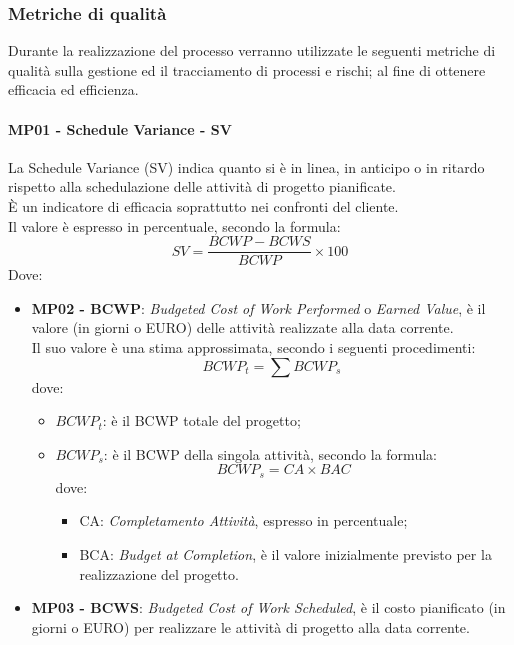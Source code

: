 	 \subsubsection{Metriche di qualità}
	 Durante la realizzazione del processo verranno utilizzate le seguenti metriche di qualità sulla gestione ed il tracciamento di processi e rischi; al fine di ottenere efficacia ed efficienza.
	 \paragraph{MP01 - Schedule Variance - SV}
	 La Schedule Variance (SV) indica quanto si è in linea, in anticipo o in ritardo rispetto alla schedulazione delle attività di progetto pianificate. \\
	 È un indicatore di efficacia soprattutto nei confronti del cliente.\\
	 Il valore è espresso in percentuale, secondo la formula:
	\begin{displaymath}
		SV = \frac{BCWP-BCWS}{BCWP}\times100
	\end{displaymath}
	Dove:

		\begin{itemize}
			\item {\bfseries MP02 - BCWP}: {\itshape Budgeted Cost of Work Performed} o {\itshape
			Earned Value}, è  il valore (in giorni o EURO) delle attività realizzate alla data corrente.\\
			Il suo valore è una stima approssimata, secondo i seguenti procedimenti:
			\begin{displaymath}
				BCWP_t = \sum BCWP_s
			\end{displaymath}
			dove:
			\begin{itemize}
				\item {\bfseries $BCWP_t$}: è il BCWP totale del progetto;
				\item {\bfseries $BCWP_s$}: è il BCWP della singola attività, secondo la formula:
				\begin{displaymath}
					BCWP_s = CA\times BAC
				\end{displaymath}
			dove:
			\begin{itemize}
				\item  CA: {\itshape Completamento Attività}, espresso in percentuale;
				\item BCA: {\itshape Budget at Completion}, è il valore inizialmente previsto per la realizzazione del progetto.
			\end{itemize}
			\end{itemize}
			\item {\bfseries MP03 - BCWS}: {\itshape Budgeted Cost of Work Scheduled}, è il costo pianificato (in giorni o EURO) per realizzare le attività di progetto alla data corrente. \\
		\end{itemize}

